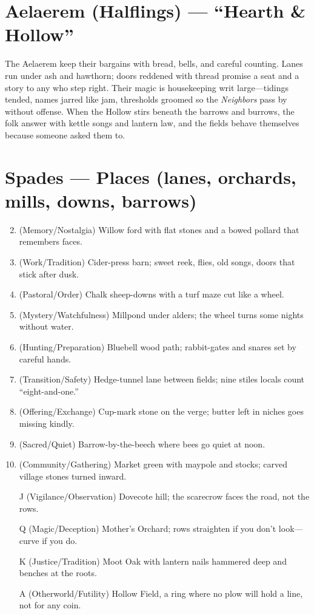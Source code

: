 \section{Aelaerem (Halflings) --- ``Hearth \& Hollow''}
\label{chap:aelaerem}

\begin{tcolorbox}[colback=black!3,colframe=black!40!white,title={Hearth \& Hollow}]
The Aelaerem keep their bargains with bread, bells, and careful counting. Lanes run under ash and hawthorn; doors reddened with thread promise a seat and a story to any who step right. Their magic is housekeeping writ large---tidings tended, names jarred like jam, thresholds groomed so the \emph{Neighbors} pass by without offense. When the Hollow stirs beneath the barrows and burrows, the folk answer with kettle songs and lantern law, and the fields behave themselves because someone asked them to.
\end{tcolorbox}

\section*{Spades --- Places (lanes, orchards, mills, downs, barrows)}
\label{sec:aelaerem-places}
\begin{enumerate}
\setcounter{enumi}{1}
\item (Memory/Nostalgia) Willow ford with flat stones and a bowed pollard that remembers faces.
\item (Work/Tradition) Cider-press barn; sweet reek, flies, old songs, doors that stick after dusk.
\item (Pastoral/Order) Chalk sheep-downs with a turf maze cut like a wheel.
\item (Mystery/Watchfulness) Millpond under alders; the wheel turns some nights without water.
\item (Hunting/Preparation) Bluebell wood path; rabbit-gates and snares set by careful hands.
\item (Transition/Safety) Hedge-tunnel lane between fields; nine stiles locals count ``eight-and-one.''
\item (Offering/Exchange) Cup-mark stone on the verge; butter left in niches goes missing kindly.
\item (Sacred/Quiet) Barrow-by-the-beech where bees go quiet at noon.
\item (Community/Gathering) Market green with maypole and stocks; carved village stones turned inward.
\item[J] (Vigilance/Observation) Dovecote hill; the scarecrow faces the road, not the rows.
\item[Q] (Magic/Deception) Mother's Orchard; rows straighten if you don't look---curve if you do.
\item[K] (Justice/Tradition) Moot Oak with lantern nails hammered deep and benches at the roots.
\item[A] (Otherworld/Futility) Hollow Field, a ring where no plow will hold a line, not for any coin.
\end{enumerate}

